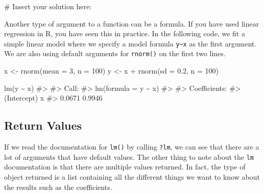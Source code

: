 \documentclass[
  letterpaper,
]{latex/krantz}
\makeatletter
\newenvironment{Shaded}{\begin{snugshade}}{\end{snugshade}}
\newcommand{\AttributeTok}[1]{\textcolor[rgb]{0.40,0.45,0.13}{#1}}
\newcommand{\CommentTok}[1]{\textcolor[rgb]{0.37,0.37,0.37}{#1}}
\newcommand{\DecValTok}[1]{\textcolor[rgb]{0.68,0.00,0.00}{#1}}
\newcommand{\FloatTok}[1]{\textcolor[rgb]{0.68,0.00,0.00}{#1}}
\newcommand{\FunctionTok}[1]{\textcolor[rgb]{0.28,0.35,0.67}{#1}}
\newcommand{\NormalTok}[1]{\textcolor[rgb]{0.00,0.23,0.31}{#1}}
\newcommand{\OtherTok}[1]{\textcolor[rgb]{0.00,0.23,0.31}{#1}}
\newcommand{\SpecialCharTok}[1]{\textcolor[rgb]{0.37,0.37,0.37}{#1}}
\newenvironment{kframe}{%
\medskip{}
\setlength{\fboxsep}{.8em}
 \def\at@end@of@kframe{}%
 \ifinner\ifhmode%
  \def\at@end@of@kframe{\end{minipage}}%
  \begin{minipage}{\columnwidth}%
 \fi\fi%
 \def\FrameCommand##1{\hskip\@totalleftmargin \hskip-\fboxsep
 \colorbox{shadecolor}{##1}\hskip-\fboxsep
     \hskip-\linewidth \hskip-\@totalleftmargin \hskip\columnwidth}%
 \MakeFramed {\advance\hsize-\width
   \@totalleftmargin\z@ \linewidth\hsize
   \@setminipage}}%
 {\par\unskip\endMakeFramed%
 \at@end@of@kframe}
\renewenvironment{Shaded}{\begin{kframe}}{\end{kframe}}
\makeatother
\begin{document}
\begin{Shaded}
\begin{Highlighting}[]
\CommentTok{\# Insert your solution here:}
\end{Highlighting}
\end{Shaded}

Another type of argument to a function can be a formula. If you have
used linear regression in R, you have seen this in practice. In the
following code, we fit a simple linear model where we specify a model
formula \texttt{y\textasciitilde{}x} as the first argument. We are also
using default arguments for
\texttt{rnorm()} on the
first two lines.

\begin{Shaded}
\begin{Highlighting}[]
\NormalTok{x }\OtherTok{\textless{}{-}} \FunctionTok{rnorm}\NormalTok{(}\AttributeTok{mean =} \DecValTok{3}\NormalTok{, }\AttributeTok{n =} \DecValTok{100}\NormalTok{)}
\NormalTok{y }\OtherTok{\textless{}{-}}\NormalTok{ x }\SpecialCharTok{+} \FunctionTok{rnorm}\NormalTok{(}\AttributeTok{sd =} \FloatTok{0.2}\NormalTok{, }\AttributeTok{n =} \DecValTok{100}\NormalTok{)}

\FunctionTok{lm}\NormalTok{(y }\SpecialCharTok{\textasciitilde{}}\NormalTok{ x)}
\CommentTok{\#\textgreater{} }
\CommentTok{\#\textgreater{} Call:}
\CommentTok{\#\textgreater{} lm(formula = y \textasciitilde{} x)}
\CommentTok{\#\textgreater{} }
\CommentTok{\#\textgreater{} Coefficients:}
\CommentTok{\#\textgreater{} (Intercept)            x  }
\CommentTok{\#\textgreater{}      0.0671       0.9946}
\end{Highlighting}
\end{Shaded}

\subsection{\texorpdfstring{Return Values
}{Return Values }}\label{return-values}

If we read the documentation for
\texttt{lm()} by calling
\texttt{?lm}, we can see that there are a lot of arguments that have
default values. The other thing to note about the \texttt{lm}
documentation is that there are multiple values returned. In fact, the
type of object returned is a list containing all the different things we
want to know about the results such as the coefficients.
\end{document}
